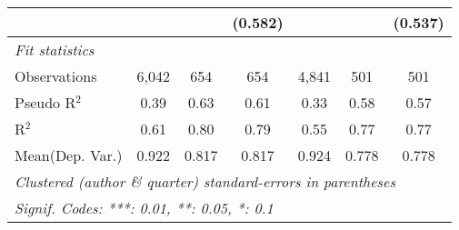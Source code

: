 \begin{tabular}{lcccccc}
                                  &              &              & (0.582)       &             &              & (0.537)\\   
   \midrule
   \emph{Fit statistics}\\
   Observations                   & 6,042        & 654          & 654           & 4,841       & 501          & 501\\  
   Pseudo R$^2$                   & 0.39         & 0.63         & 0.61          & 0.33        & 0.58         & 0.57\\  
   R$^2$                          & 0.61         & 0.80         & 0.79          & 0.55        & 0.77         & 0.77\\  
Mean(Dep. Var.) & 0.922 & 0.817 & 0.817 & 0.924 & 0.778 & 0.778 \\
   \midrule \midrule
   \multicolumn{7}{l}{\emph{Clustered (author \& quarter) standard-errors in parentheses}}\\
   \multicolumn{7}{l}{\emph{Signif. Codes: ***: 0.01, **: 0.05, *: 0.1}}\\
\end{tabular}
\par\endgroup
